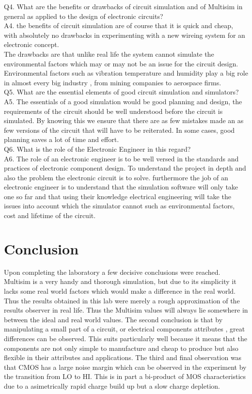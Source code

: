 \documentclass{article}
\begin{document}
\begin{flushleft}
Q4. What are the benefits or drawbacks of circuit simulation and of Multisim in general as applied to the design of electronic circuits?\\
A4. the benefits of circuit simulation are of course that it is quick and cheap, with absolutely no drawbacks in experimenting with a new wireing system for an electronic concept.\\
The drawbacks are that unlike real life the system cannot simulate the environmental factors which may or may not be an issue for the circuit design. Environmental factors such as vibration temperature and humidity play a big role in almost every big industry , from mining companies to aerospace firms.\\
Q5. What are the essential elements of good circuit simulation and simulators?\\
A5. The essentials of a good simulation would be good planning and design, the requirements of the circuit should be well understood before the circuit is simulated. By knowing this we ensure that there are as few mistakes made an as few versions of the circuit that will have to be reiterated. In some cases, good planning saves a lot of time and effort. \\
Q6. What is the role of the Electronic  Engineer in this regard?\\
A6. The role of an electronic engineer is to be well versed in the standards and practices of electronic component design. To understand the project in depth and also the problem the electronic circuit is to solve.
furthermore the job of an electronic engineer is to understand that the simulation software will only take one so far and that using their knowledge electrical engineering will take the issues into account which the simulator cannot such as environmental factors, cost and lifetime of the circuit. \\
\end{flushleft}


\pagebreak

\section{Conclusion}
Upon completing the laboratory a few decisive conclusions were reached. Multisim is a very handy and thorough simulation, but due to its simplicity it lacks some real world factors which would make a difference in the real world. Thus the results obtained in this lab were merely a rough approximation of the results observer in real life. Thus the Multisim values will always lie somewhere in between the ideal and real world values.
The second conclusion is that by manipulating a small part of a circuit, or electrical components attributes , great differences can be observed. This suits particularly well because it means that the components are not only simple to manufacture and cheap to produce but also flexible in their attributes and applications.
The third and final observation was that CMOS has a large noise margin which can be observed in the experiment by the transition from LO to HI. This is in part a bi-product of MOS characteristics due to a asimetrically  rapid charge build up but a slow charge depletion.
\end{document}
